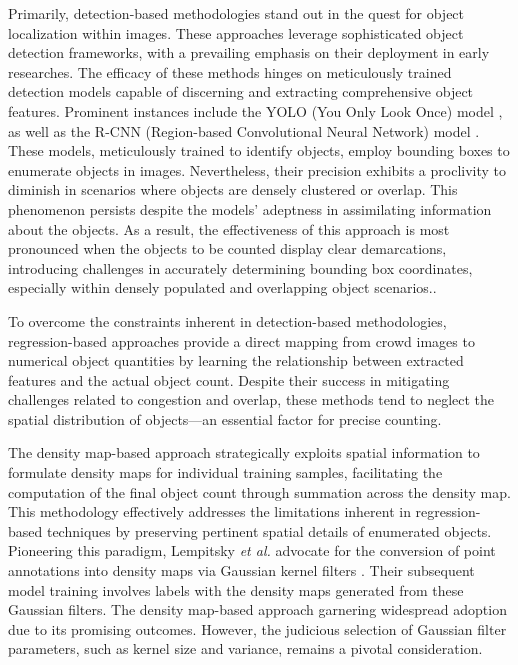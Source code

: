 \documentclass[journal]{IEEEtran}
\begin{document}
Primarily, detection-based methodologies stand out in the quest for object localization within images. These approaches leverage sophisticated object detection frameworks, with a prevailing emphasis on their deployment in early researches. The efficacy of these methods hinges on meticulously trained detection models capable of discerning and extracting comprehensive object features. Prominent instances include the YOLO (You Only Look Once) model \cite{shrimp_yolo1, shrimp_yolo2, yolo3}, as well as the R-CNN (Region-based Convolutional Neural Network) model \cite{shrimp_rcnn1, shrimp_rcnn2, rcnn3}. These models, meticulously trained to identify objects, employ bounding boxes to enumerate objects in images. Nevertheless, their precision exhibits a proclivity to diminish in scenarios where objects are densely clustered or overlap. This phenomenon persists despite the models' adeptness in assimilating information about the objects. As a result, the effectiveness of this approach is most pronounced when the objects to be counted display clear demarcations, introducing challenges in accurately determining bounding box coordinates, especially within densely populated and overlapping object scenarios.\cite{densitymapsurvey}.

To overcome the constraints inherent in detection-based methodologies, regression-based approaches provide a direct mapping from crowd images to numerical object quantities by learning the relationship between extracted features and the actual object count. Despite their success in mitigating challenges related to congestion and overlap, these methods tend to neglect the spatial distribution of objects—an essential factor for precise counting.

The density map-based approach strategically exploits spatial information to formulate density maps for individual training samples, facilitating the computation of the final object count through summation across the density map. This methodology effectively addresses the limitations inherent in regression-based techniques by preserving pertinent spatial details of enumerated objects. Pioneering this paradigm, Lempitsky \textit{et al.} advocate for the conversion of point annotations into density maps via Gaussian kernel filters \cite{firstdensity}. Their subsequent model training involves labels with the density maps generated from these Gaussian filters. The density map-based approach  garnering widespread adoption due to its promising outcomes. However, the judicious selection of Gaussian filter parameters, such as kernel size and variance, remains a pivotal consideration.
\end{document}

